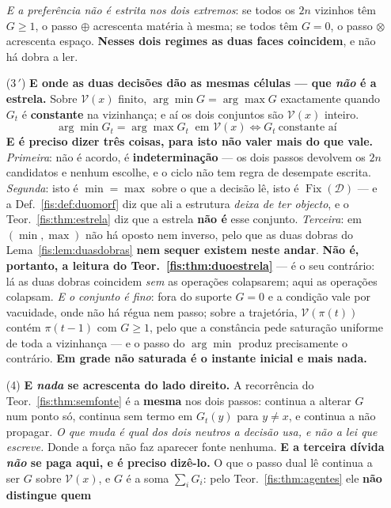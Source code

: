 \documentclass[livro.tex]{subfiles}
\begin{document}
\begin{teorema}
\begin{enumerate}
\smallskip
\emph{E a preferência não é estrita nos dois extremos}: se todos os $2n$ vizinhos
têm $G\ge1$, o passo $\oplus$ acrescenta matéria à mesma; se todos têm $G=0$, o
passo $\otimes$ acrescenta espaço. \textbf{Nesses dois regimes as duas faces
coincidem}, e não há dobra a ler.
\item[(3\,\!$'$)] \textbf{E onde as duas decisões dão as mesmas células --- que
\emph{não} é a estrela.} Sobre $\mathcal{V}(x)$ finito,
$\arg\min G=\arg\max G$ exactamente quando $G_t$ é \textbf{constante} na
vizinhança; e aí os dois conjuntos são $\mathcal{V}(x)$ inteiro.
\[
\boxed{\;\arg\min G_t=\arg\max G_t\ \text{ em }\mathcal{V}(x)\iff G_t\ \text{constante aí}\;}
\]
\textbf{E é preciso dizer três coisas, para isto não valer mais do que vale.}
\emph{Primeira}: não é acordo, é \textbf{indeterminação} --- os dois passos
devolvem os $2n$ candidatos e nenhum escolhe, e o ciclo não tem regra de
desempate escrita. \emph{Segunda}: isto é $\min=\max$ sobre o que a decisão lê,
isto é $\operatorname{Fix}(\mathcal{D})$ --- e a Def.~\ref{fis:def:duomorf} diz
que ali a estrutura \emph{deixa de ter objecto}, e o Teor.~\ref{fis:thm:estrela}
diz que a estrela \textbf{não é} esse conjunto. \emph{Terceira}: em
$(\min,\max)$ não há oposto nem inverso, pelo que as duas dobras do
Lema~\ref{fis:lem:duasdobras} \textbf{nem sequer existem neste andar}. \textbf{Não
é, portanto, a leitura do Teor.~\ref{fis:thm:duoestrela}} --- é o seu contrário:
lá as duas dobras coincidem \emph{sem} as operações colapsarem; aqui as operações
colapsam.
\smallskip
\emph{E o conjunto é fino}: fora do suporte $G=0$ e a condição vale por
vacuidade, onde não há régua nem passo; sobre a trajetória, $\mathcal{V}(\pi(t))$
contém $\pi(t-1)$ com $G\ge1$, pelo que a constância pede saturação uniforme de
toda a vizinhança --- e o passo do $\arg\min$ produz precisamente o contrário.
\textbf{Em grade não saturada é o instante inicial e mais nada.}
\item[(4)] \textbf{E \emph{nada} se acrescenta do lado direito.} A recorrência do
Teor.~\ref{fis:thm:semfonte} é a \textbf{mesma} nos dois passos: continua a
alterar $G$ num ponto só, continua sem termo em $G_t(y)$ para $y\neq x$, e
continua a não propagar. \emph{O que muda é qual dos dois neutros a decisão usa,
e não a lei que escreve.} Donde a força não faz aparecer fonte nenhuma.
\smallskip
\textbf{E a terceira dívida \emph{não} se paga aqui, e é preciso dizê-lo.} O que
o passo dual lê continua a ser $G$ sobre $\mathcal{V}(x)$, e $G$ é a soma
$\sum_i G_i$: pelo Teor.~\ref{fis:thm:agentes} ele \textbf{não distingue quem
}
\end{enumerate}
\end{teorema}
\end{document}
